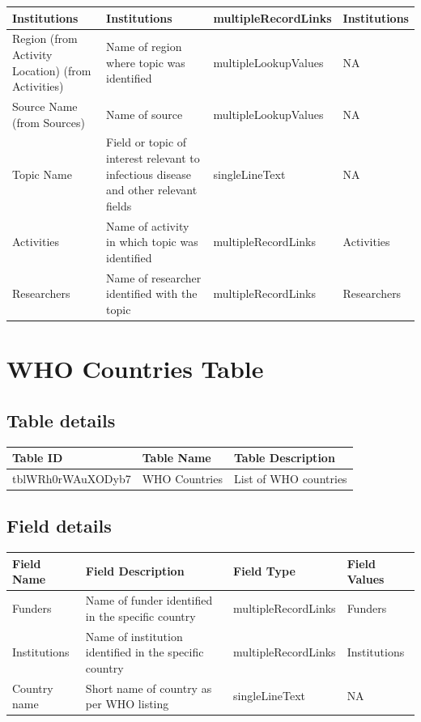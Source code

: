 \documentclass[
]{book}
\begin{document}
\begin{table}
\begin{tabular}{l|l|l|l}
\hline
Institutions & Institutions & multipleRecordLinks & Institutions\\
\hline
Region (from Activity Location) (from Activities) & Name of region where topic was identified & multipleLookupValues & NA\\
\hline
Source Name (from Sources) & Name of source & multipleLookupValues & NA\\
\hline
Topic Name & Field or topic of interest relevant to infectious disease and other relevant fields & singleLineText & NA\\
\hline
Activities & Name of activity in which topic was identified & multipleRecordLinks & Activities\\
\hline
Researchers & Name of researcher identified with the topic & multipleRecordLinks & Researchers\\
\hline
\end{tabular}
\end{table}

\hypertarget{who-countries-table}{%
\section{WHO Countries Table}\label{who-countries-table}}

\hypertarget{table-details-10}{%
\subsection{Table details}\label{table-details-10}}

\begin{table}
\centering
\begin{tabular}{l|l|l}
\hline
\textbf{Table ID} & \textbf{Table Name} & \textbf{Table Description}\\
\hline
tblWRh0rWAuXODyb7 & WHO Countries & List of WHO countries\\
\hline
\end{tabular}
\end{table}

\hypertarget{field-details-7}{%
\subsection{Field details}\label{field-details-7}}

\begin{table}
\centering
\begin{tabular}{l|l|l|l}
\hline
\textbf{Field Name} & \textbf{Field Description} & \textbf{Field Type} & \textbf{Field Values}\\
\hline
Funders & Name of funder identified in the specific country & multipleRecordLinks & Funders\\
\hline
Institutions & Name of institution identified in the specific country & multipleRecordLinks & Institutions\\
\hline
Country name & Short name of country as per WHO listing & singleLineText & NA\\
\hline
\end{tabular}
\end{table}
\end{document}
